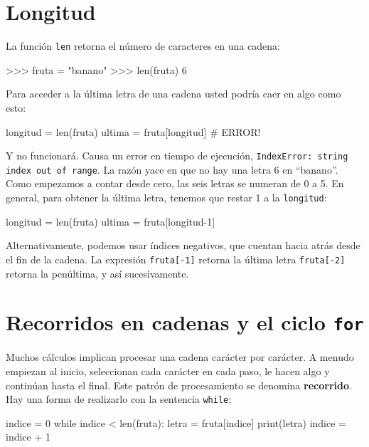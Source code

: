 
\section{Longitud}

 

La función \texttt{len} retorna el número de caracteres en una cadena:

\begin{pyconcode}
>>> fruta = "banano"
>>> len(fruta)
6
\end{pyconcode}
 Para acceder a la última letra de una cadena usted podría caer en
algo como esto:
\begin{pythoncode}
longitud = len(fruta)
ultima = fruta[longitud]       # ERROR!
\end{pythoncode}

Y no funcionará. Causa un error en tiempo de ejecución, \texttt{IndexError: string
index out of range}. La razón yace en que no hay una letra 6 en ``banano''.
Como empezamos a contar desde cero, las seis letras se numeran de
0 a 5. En general, para obtener la última letra, tenemos que restar
1 a la \texttt{longitud}:


\begin{pythoncode}
longitud = len(fruta)
ultima = fruta[longitud-1]
\end{pythoncode}

Alternativamente, podemos usar índices negativos, que cuentan hacia
atrás desde el fin de la cadena. La expresión \texttt{fruta{[}-1{]}}
retorna la última letra \texttt{fruta{[}-2{]}} retorna la penúltima,
y así sucesivamente.


\pagebreak

\section{Recorridos en cadenas y el ciclo \texttt{for}}

\label{for} 

   

Muchos cálculos implican procesar una cadena carácter por carácter.
A menudo empiezan al inicio, seleccionan cada carácter en cada paso,
le hacen algo y continúan hasta el final. Este patrón de procesamiento
se denomina \textbf{recorrido}. Hay una forma de realizarlo con la
sentencia \texttt{while}:
\begin{pythoncode}
indice = 0
while indice < len(fruta):
  letra = fruta[indice]
  print(letra)
  indice = indice + 1
\end{pythoncode}

